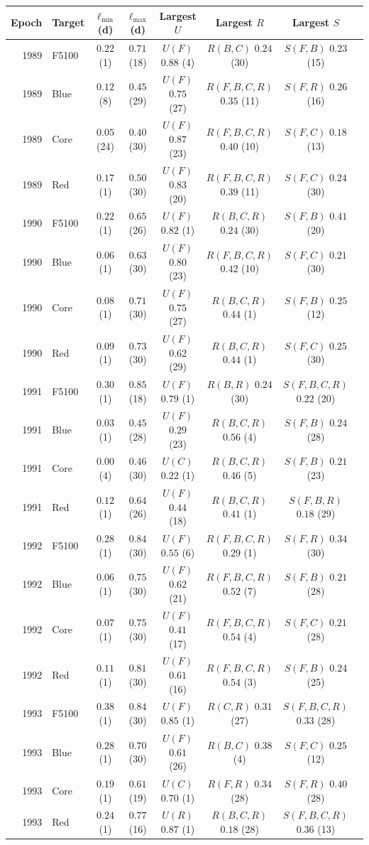 \begin{tabular}{rlcccccc}
\toprule
Epoch & Target & $\ell_{\min}$ (d) & $\ell_{\max}$ (d) & Largest $U$ & Largest $R$ & Largest $S$ \\
\midrule
1989 & F5100 & $0.22$ (1) & $0.71$ (18) & $U(F)$ $0.88$ (4) & $R(B,C)$ $0.24$ (30) & $S(F,B)$ $0.23$ (15) \\
1989 & Blue & $0.12$ (8) & $0.45$ (29) & $U(F)$ $0.75$ (27) & $R(F,B,C,R)$ $0.35$ (11) & $S(F,R)$ $0.26$ (16) \\
1989 & Core & $0.05$ (24) & $0.40$ (30) & $U(F)$ $0.87$ (23) & $R(F,B,C,R)$ $0.40$ (10) & $S(F,C)$ $0.18$ (13) \\
1989 & Red & $0.17$ (1) & $0.50$ (30) & $U(F)$ $0.83$ (20) & $R(F,B,C,R)$ $0.39$ (11) & $S(F,C)$ $0.24$ (30) \\
\midrule
1990 & F5100 & $0.22$ (1) & $0.65$ (26) & $U(F)$ $0.82$ (1) & $R(B,C,R)$ $0.24$ (30) & $S(F,B)$ $0.41$ (20) \\
1990 & Blue & $0.06$ (1) & $0.63$ (30) & $U(F)$ $0.80$ (23) & $R(F,B,C,R)$ $0.42$ (10) & $S(F,C)$ $0.21$ (30) \\
1990 & Core & $0.08$ (1) & $0.71$ (30) & $U(F)$ $0.75$ (27) & $R(B,C,R)$ $0.44$ (1) & $S(F,B)$ $0.25$ (12) \\
1990 & Red & $0.09$ (1) & $0.73$ (30) & $U(F)$ $0.62$ (29) & $R(B,C,R)$ $0.44$ (1) & $S(F,C)$ $0.25$ (30) \\
\midrule
1991 & F5100 & $0.30$ (1) & $0.85$ (18) & $U(F)$ $0.79$ (1) & $R(B,R)$ $0.24$ (30) & $S(F,B,C,R)$ $0.22$ (20) \\
1991 & Blue & $0.03$ (1) & $0.45$ (28) & $U(F)$ $0.29$ (23) & $R(B,C,R)$ $0.56$ (4) & $S(F,B)$ $0.24$ (28) \\
1991 & Core & $0.00$ (4) & $0.46$ (30) & $U(C)$ $0.22$ (1) & $R(B,C,R)$ $0.46$ (5) & $S(F,B)$ $0.21$ (23) \\
1991 & Red & $0.12$ (1) & $0.64$ (26) & $U(F)$ $0.44$ (18) & $R(B,C,R)$ $0.41$ (1) & $S(F,B,R)$ $0.18$ (29) \\
\midrule
1992 & F5100 & $0.28$ (1) & $0.84$ (30) & $U(F)$ $0.55$ (6) & $R(F,B,C,R)$ $0.29$ (1) & $S(F,R)$ $0.34$ (30) \\
1992 & Blue & $0.06$ (1) & $0.75$ (30) & $U(F)$ $0.62$ (21) & $R(F,B,C,R)$ $0.52$ (7) & $S(F,B)$ $0.21$ (28) \\
1992 & Core & $0.07$ (1) & $0.75$ (30) & $U(F)$ $0.41$ (17) & $R(F,B,C,R)$ $0.54$ (4) & $S(F,C)$ $0.21$ (28) \\
1992 & Red & $0.11$ (1) & $0.81$ (30) & $U(F)$ $0.61$ (16) & $R(F,B,C,R)$ $0.54$ (3) & $S(F,B)$ $0.24$ (25) \\
\midrule
1993 & F5100 & $0.38$ (1) & $0.84$ (30) & $U(F)$ $0.85$ (1) & $R(C,R)$ $0.31$ (27) & $S(F,B,C,R)$ $0.33$ (28) \\
1993 & Blue & $0.28$ (1) & $0.70$ (30) & $U(F)$ $0.61$ (26) & $R(B,C)$ $0.38$ (4) & $S(F,C)$ $0.25$ (12) \\
1993 & Core & $0.19$ (1) & $0.61$ (19) & $U(C)$ $0.70$ (1) & $R(F,R)$ $0.34$ (28) & $S(F,R)$ $0.40$ (28) \\
1993 & Red & $0.24$ (1) & $0.77$ (16) & $U(R)$ $0.87$ (1) & $R(B,C,R)$ $0.18$ (28) & $S(F,B,C,R)$ $0.36$ (13) \\
\bottomrule
\end{tabular}
